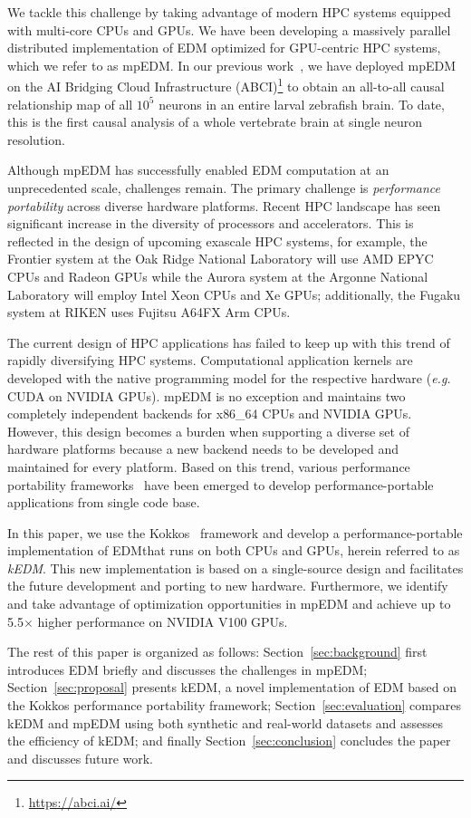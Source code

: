 \documentclass[sigconf]{acmart}
\begin{document}
We tackle this challenge by taking advantage of modern HPC systems equipped
with multi-core CPUs and GPUs. We have been developing a massively
parallel distributed implementation of EDM optimized for GPU-centric HPC
systems, which we refer to as mpEDM. In our previous work~\cite{mpedm}, we have deployed mpEDM on the AI
Bridging Cloud Infrastructure (ABCI)\footnote{\url{https://abci.ai/}} to
obtain an all-to-all causal relationship map of all $10^5$ neurons in an
entire larval zebrafish brain. To date, this is the first causal analysis
of a whole vertebrate brain at single neuron resolution.

Although mpEDM has successfully enabled EDM computation at an unprecedented
scale, challenges remain. The primary challenge is
\textit{performance portability} across diverse hardware platforms. Recent HPC
landscape has seen significant increase in the diversity of processors and
accelerators. This is reflected in the design of upcoming exascale HPC systems, for example, 
the Frontier system at the Oak Ridge National Laboratory will use AMD EPYC
CPUs and Radeon GPUs while the Aurora system at the Argonne National
Laboratory will employ Intel Xeon CPUs and Xe GPUs; additionally, the Fugaku system at RIKEN
uses Fujitsu A64FX Arm CPUs.

The current design of HPC applications has failed to keep up with this trend
of rapidly diversifying HPC systems. Computational application kernels are developed with the native programming model for the
respective hardware (\textit{e.g.} CUDA on NVIDIA GPUs). mpEDM is no exception and
maintains two completely independent backends for x86\_64 CPUs and NVIDIA
GPUs. However, this design becomes a burden when supporting a diverse set of
hardware platforms because a new backend needs to be developed and maintained
for every platform. Based on this trend, various performance portability
frameworks~\cite{Deakin2019, Deakin2020} have been emerged to develop
performance-portable applications from single code base.

In this paper, we use the Kokkos~\cite{Edwards2014} framework and develop a performance-portable implementation of EDM\@ that runs on
both CPUs and GPUs, herein referred to as \textit{kEDM}. This new implementation is based on a single-source design and
facilitates the future development and porting to new hardware. Furthermore,
we identify and take advantage of optimization opportunities in mpEDM and
achieve up to 5.5$\times$ higher performance on NVIDIA V100 GPUs.

The rest of this paper is organized as follows: Section~\ref{sec:background}
first introduces EDM briefly and discusses the challenges in mpEDM\@;
Section~\ref{sec:proposal} presents kEDM, a novel implementation of EDM based on the Kokkos performance portability framework;
Section~\ref{sec:evaluation} compares kEDM and mpEDM using both synthetic and real-world datasets and assesses the efficiency of kEDM\@; and finally
Section~\ref{sec:conclusion} concludes the paper and discusses future work.
\end{document}
